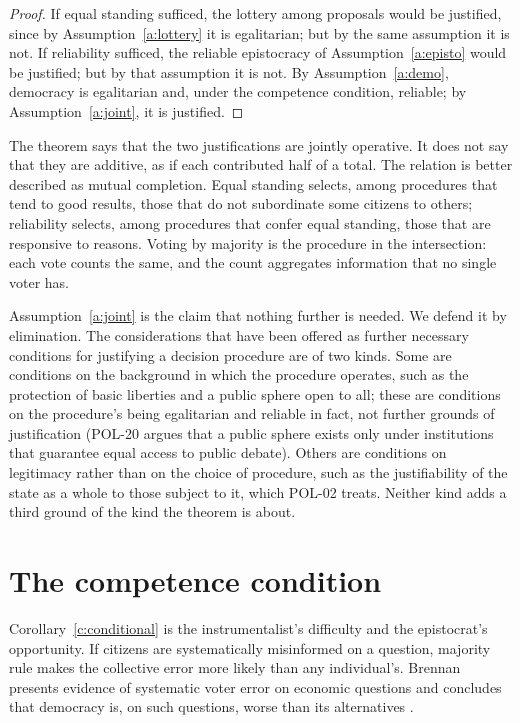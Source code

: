 \documentclass{situationist-preprint}
\begin{document}
\begin{proof}
If equal standing sufficed, the lottery among proposals would be justified, since by Assumption~\ref{a:lottery} it is egalitarian; but by the same assumption it is not. If reliability sufficed, the reliable epistocracy of Assumption~\ref{a:episto} would be justified; but by that assumption it is not. By Assumption~\ref{a:demo}, democracy is egalitarian and, under the competence condition, reliable; by Assumption~\ref{a:joint}, it is justified.
\end{proof}

The theorem says that the two justifications are jointly operative. It does not say that they are additive, as if each contributed half of a total. The relation is better described as mutual completion. Equal standing selects, among procedures that tend to good results, those that do not subordinate some citizens to others; reliability selects, among procedures that confer equal standing, those that are responsive to reasons. Voting by majority is the procedure in the intersection: each vote counts the same, and the count aggregates information that no single voter has.

Assumption~\ref{a:joint} is the claim that nothing further is needed. We defend it by elimination. The considerations that have been offered as further necessary conditions for justifying a decision procedure are of two kinds. Some are conditions on the background in which the procedure operates, such as the protection of basic liberties and a public sphere open to all; these are conditions on the procedure's being egalitarian and reliable in fact, not further grounds of justification (POL-20 argues that a public sphere exists only under institutions that guarantee equal access to public debate). Others are conditions on legitimacy rather than on the choice of procedure, such as the justifiability of the state as a whole to those subject to it, which POL-02 treats. Neither kind adds a third ground of the kind the theorem is about.

\section{The competence condition}

Corollary~\ref{c:conditional} is the instrumentalist's difficulty and the epistocrat's opportunity. If citizens are systematically misinformed on a question, majority rule makes the collective error more likely than any individual's. Brennan presents evidence of systematic voter error on economic questions and concludes that democracy is, on such questions, worse than its alternatives \citep{Brennan2016}.
\end{document}
